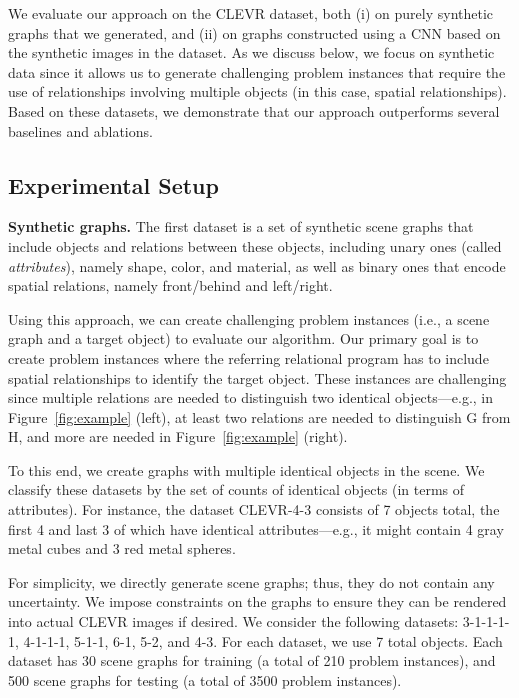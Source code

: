 
We evaluate our approach on the CLEVR dataset, both (i) on purely synthetic graphs that we generated, and (ii) on graphs constructed using a CNN based on the synthetic images in the dataset. As we discuss below, we focus on synthetic data since it allows us to generate challenging problem instances that require the use of relationships involving multiple objects (in this case, spatial relationships). Based on these datasets, we demonstrate that our approach outperforms several baselines and ablations.

\subsection{Experimental Setup}

\textbf{Synthetic graphs.}
%
The first dataset is a set of synthetic scene graphs that include objects and relations between these objects, including unary ones (called \emph{attributes}), namely shape, color, and material, as well as binary ones that encode spatial relations, namely front/behind and left/right.

Using this approach, we can create challenging problem instances (i.e., a scene graph and a target object) to evaluate our algorithm. Our primary goal is to create problem instances where the referring relational program has to include spatial relationships to identify the target object. These instances are challenging since multiple relations are needed to distinguish two identical objects---e.g., in Figure~\ref{fig:example} (left), at least two relations are needed to distinguish G from H, and more are needed in Figure~\ref{fig:example} (right).

To this end, we create graphs with multiple identical objects in the scene. We classify these datasets by the set of counts of identical objects (in terms of attributes). For instance, the dataset CLEVR-4-3 consists of 7 objects total, the first 4 and last 3 of which have identical attributes---e.g., it might contain 4 gray metal cubes and 3 red metal spheres.

For simplicity, we directly generate scene graphs; thus, they do not contain any uncertainty. We impose constraints on the graphs to ensure they can be rendered into actual CLEVR images if desired. We consider the following datasets: 3-1-1-1-1, 4-1-1-1, 5-1-1, 6-1, 5-2, and 4-3. For each dataset, we use 7 total objects. Each dataset has 30 scene graphs for training (a total of 210 problem instances), and 500 scene graphs for testing (a total of 3500 problem instances).

